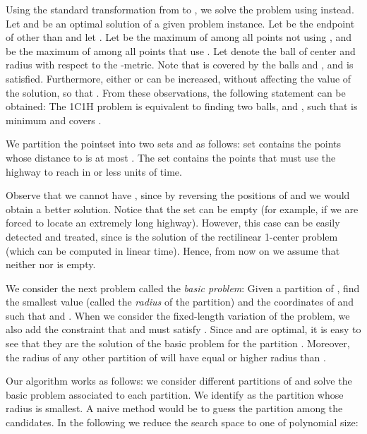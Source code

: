\documentclass{llncs}
\begin{document}
\medskip
Using the standard transformation from  to , we solve the problem using  instead.
Let  and  be an optimal solution of a given problem instance. Let  be the endpoint of  other than  and let .
Let  be the maximum of  among all points  not using ,
and  be the maximum of  among all points  that use .
Let  denote the ball of center  and radius  with respect to the -metric.
Note that  is covered by the balls  and , and
 is satisfied.
Furthermore, either  or  can be increased, without affecting the value  of the solution, so that
.
From these observations, the following
statement can be obtained: The 1C1H problem is equivalent to finding two balls,  and , such that  is minimum and  covers .









\medskip

We partition the pointset  into two sets  and  as follows: set  contains the points whose  distance to  is at most . The set  contains the points that must use the highway to reach  in  or less units of time.

Observe that we cannot have , since by reversing the positions of  and  we would obtain a better solution. Notice that the set  can be empty (for example, if we are forced to locate an extremely long highway). However, this case can be easily detected and treated, since  is the solution of the rectilinear 1-center problem~\cite{drezner87} (which can be computed in linear time).
Hence, from now on we assume that neither  nor  is empty.

We consider the next problem called the \emph{basic problem}: Given a partition  of , find the smallest value  (called the {\em radius} of the partition) and the coordinates of  and  such that  and . When we consider the fixed-length variation of the problem, we also add the constraint that  and  must satisfy . Since  and  are optimal, it is easy to see that they are the solution of the basic problem for the partition . Moreover, the radius of any other partition of  will have equal or higher radius than .

Our algorithm works as follows: we consider different partitions of  and solve the basic problem associated to each partition. We identify  as the partition whose radius is smallest. A naive method would be to guess the partition  among the  candidates. In the following we reduce the search space to one of polynomial size:
\end{document}

